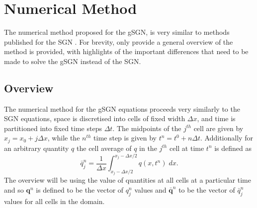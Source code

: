 \documentclass[10pt]{elsarticle}
\newcommand{\vecn}[1]{\boldsymbol{#1}}
\begin{document}
\section{Numerical Method}
The numerical method proposed for the gSGN, is very similar to methods published for the SGN \cite{Zoppou-etal-2017}. For brevity, only provide a general overview of the method is provided, with highlights of the important differences that need to be made to solve the gSGN instead of the SGN.

\subsection{Overview}
The numerical method for the gSGN equations proceeds very similarly to the SGN equations, space is discretised into cells of fixed width $\Delta x$, and time is partitioned into fixed time steps $\Delta t$. The midpoints of the $j^{th}$ cell are given by $x_j = x_0 + j \Delta x$, while the $n^{th}$ time step is given by $t^n = t^0 + n \Delta t$. Additionally for an arbitrary quantity $q$ the cell average of $q$ in the $j^{th}$ cell at time $t^n$ is defined as 
\[\bar{q}^n_j = \frac{1}{\Delta x} \int_{x_j - \Delta x / 2}^{x_j - \Delta x / 2} q(x,t^n) \; dx.\]
The overview will be using the value of quantities at all cells at a particular time and so $\vecn{q}^n$ is defined to be the vector of $q^n_j$ values and $\bar{\vecn{q}}^n$ to be the vector of $\bar{q}^n_j$ values for all cells in the domain. 
\end{document}
